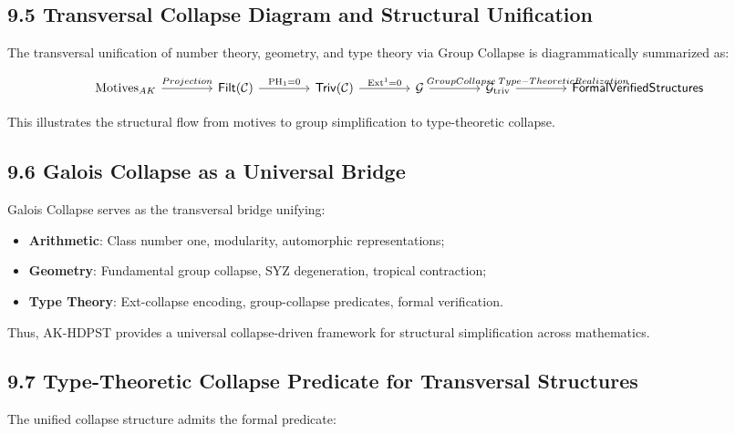 \documentclass[11pt]{article}
\begin{document}
\subsection*{9.5 Transversal Collapse Diagram and Structural Unification}

The transversal unification of number theory, geometry, and type theory via Group Collapse is diagrammatically summarized as:

\[
\begin{tikzcd}[column sep=4em]
\mathrm{Motives}_{AK} \arrow[r, "Projection"]
& \mathsf{Filt}(\mathcal{C}) \arrow[r, "\mathrm{PH}_1 = 0"]
& \mathsf{Triv}(\mathcal{C}) \arrow[r, "\mathrm{Ext}^1 = 0"]
& \mathcal{G} \arrow[r, "\hspace{1em}Group Collapse"]
& \mathcal{G}_{\mathrm{triv}} \arrow[r, "\hspace{3.5em}Type-Theoretic Realization"]
& \mathsf{Formal Verified Structures}
\end{tikzcd}
\]


This illustrates the structural flow from motives to group simplification to type-theoretic collapse.

\subsection*{9.6 Galois Collapse as a Universal Bridge}

Galois Collapse serves as the transversal bridge unifying:

\begin{itemize}
    \item \textbf{Arithmetic}: Class number one, modularity, automorphic representations;
    \item \textbf{Geometry}: Fundamental group collapse, SYZ degeneration, tropical contraction;
    \item \textbf{Type Theory}: Ext-collapse encoding, group-collapse predicates, formal verification.
\end{itemize}

Thus, AK-HDPST provides a universal collapse-driven framework for structural simplification across mathematics.

\subsection*{9.7 Type-Theoretic Collapse Predicate for Transversal Structures}

The unified collapse structure admits the formal predicate:
\end{document}

